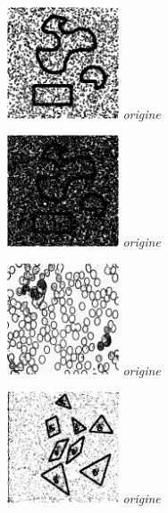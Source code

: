 \documentclass[a4,12pt]{article}
\begin{document}
\noindent
\begin{minipage}[c]{0.20\linewidth}
	\begin{center}
		\includegraphics[width = 33mm]{./img/p2test_grad_const_formes1pets1.jpg}
		\textit{origine}
	\end{center}
\end{minipage}
\begin{minipage}[c]{0.20\linewidth}
	\begin{center}
		\includegraphics[width = 33mm]{./img/p2test_grad_const_formes1pets5.jpg}
		\textit{origine}
	\end{center}
\end{minipage}
\begin{minipage}[c]{0.20\linewidth}
	\begin{center}
		\includegraphics[width = 33mm]{./img/p2test_grad_const_globules.jpg}
		\textit{origine}
	\end{center}
\end{minipage}
\begin{minipage}[c]{0.20\linewidth}
	\begin{center}
		\includegraphics[width = 33mm]{./img/p2test_grad_const_tangram.jpg}
		\textit{origine}
	\end{center}
\end{minipage}
\end{document}
